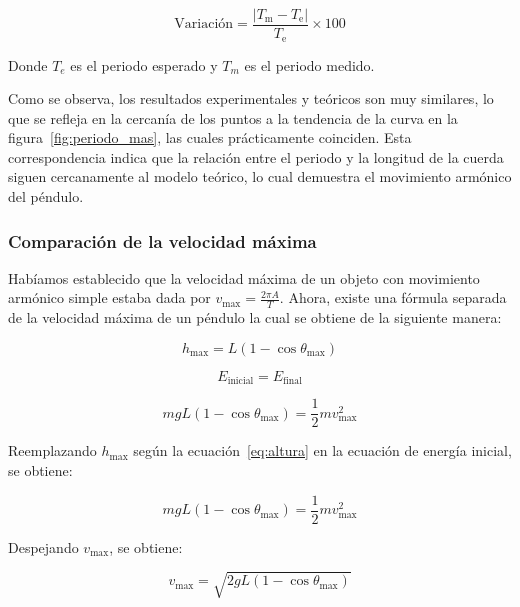 \documentclass[letterpaper]{report}
\numberwithin{table}{section}
\begin{document}
\begin{equation}
  \text{Variación} = \frac{\lvert T_{\text{m}} -
  T_{\text{e}} \rvert}{T_{\text{e}}} \times 100
\end{equation}

Donde $T_{e}$ es el periodo esperado y $T_{m}$ es el periodo medido.

Como se observa, los resultados experimentales y teóricos son muy
similares, lo que se refleja en la cercanía de los puntos a la
tendencia de la curva en la figura~\ref{fig:periodo_mas},
las cuales prácticamente coinciden. Esta correspondencia indica que
la relación entre el periodo y la longitud de la cuerda siguen
cercanamente al modelo teórico, lo cual demuestra el movimiento
armónico del péndulo.

\subsubsection{Comparación de la velocidad máxima}

Habíamos establecido que la velocidad máxima de un objeto con
movimiento armónico simple estaba dada por $v_{\max} =
\frac{2\pi A}{T}$. Ahora, existe una fórmula separada de la velocidad
máxima de un péndulo la cual se obtiene de la siguiente manera:

\begin{equation}
  h_{\max} = L(1 - \cos{\theta_{\max}})\label{eq:altura}
\end{equation}

\begin{equation}
  E_{\text{inicial}} = E_{\text{final}}
\end{equation}

\begin{equation}
  mgL(1 - \cos{\theta_{\max}}) = \frac{1}{2}mv_{\max}^{2}
\end{equation}

Reemplazando $h_{\max}$ según la ecuación~\eqref{eq:altura} en la ecuación
de energía inicial, se obtiene:

\begin{equation}
  mgL(1 - \cos{\theta_{\max}}) = \frac{1}{2}mv_{\max}^{2}
\end{equation}

Despejando $v_{\max}$, se obtiene:

\begin{equation}
  v_{\max} = \sqrt{2gL(1 - \cos{\theta_{\max}})}\label{eq:velocidad_max_energía}
\end{equation}
\end{document}
